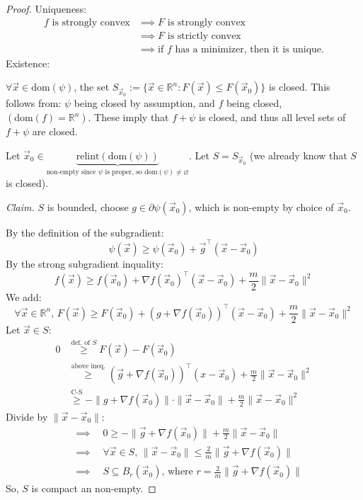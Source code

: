 \documentclass{article}
\newcommand{\R}{\mathbb{R}}             %
\newcommand{\x}{\vec{x}}
\newcommand{\dom}{\text{dom}}           %
\newcommand{\relint}{\text{relint}}     %
\begin{document}
\begin{proof}
    Uniqueness:
    \begin{align*}
        f \text{ is strongly convex} &\implies F \text{ is strongly convex} \\
        &\implies F \text{ is strictly convex} \\
        &\implies \text{if } f \text{ has a minimizer, then it is unique.}
    \end{align*}
    Existence:

    $\forall \x \in \dom(\psi)$, the set $S_{\x_0} := \{\x \in \R^n : F(\x) \leq F(\x_0)\}$ is closed. This follows from: $\psi$ being closed by assumption, and $f$ being closed, $(\dom(f) = \R^n)$. These imply that $f + \psi$ is closed, and thus all level sets of $f + \psi$ are closed.

    Let $\x_0 \in \underbrace{\relint(\dom(\psi))}_{\text{non-empty since } \psi \text{ is proper, so } \dom(\psi) \neq \varnothing}$. Let $S = S_{\x_0}$ (we already know that $S$ is closed).

    \textit{Claim.} $S$ is bounded, choose $g \in \partial \psi(\x_0)$, which is non-empty by choice of $\x_0$.

    By the definition of the subgradient:
    \[
        \psi(\x) \geq \psi(\x_0) + \vec{g}^\top(\x - \x_0)
    \]
    By the strong subgradient inquality:
    \[
        f(\x) \geq f(\x_0) + \nabla f(\x_0)^\top(\x - \x_0) + \frac{m}{2}\|\x - \x_0\|^2
    \]
    We add:
    \[
        \forall \x \in \R^n,\, F(\x) \geq F(\x_0) + (g + \nabla f(\x_0))^\top(\x - \x_0) + \frac{m}{2}\|\x - \x_0\|^2
    \]
    Let $\x \in S$:
    \begin{align*}
        0 &\overset{\text{def. of } S}{\geq} F(\x) - F(\x_0) \\
        &\overset{\text{above ineq.}}{\geq} (\vec{g} + \nabla f(\x_0))^\top(x - \x_0) + \frac{m}{2}\|\x - \x_0\|^2 \\
        &\overset{\text{C-S}}{\geq} -\|g + \nabla f(\x_0)\| \cdot \|\x - \x_0\| + \frac{m}{2}\|\x - \x_0\|^2
    \end{align*}
    Divide by $\|\x - \x_0\|$:
    \begin{align*}
        &\implies \quad 0 \geq -\|\vec{g} + \nabla f(\x_0)\| + \frac{m}{2}\|\x - \x_0\| \\
        &\implies \quad \forall \x \in S,\, \|\x - \x_0\| \leq \frac{2}{m}\|\vec{g} + \nabla f(\x_0)\| \\
        &\implies \quad S \subseteq B_r(\x_0),\, \text{where } r = \frac{2}{m}\|\vec{g} + \nabla f(\x_0)\|
    \end{align*}
    So, $S$ is compact an non-empty.


\end{proof}
\end{document}
